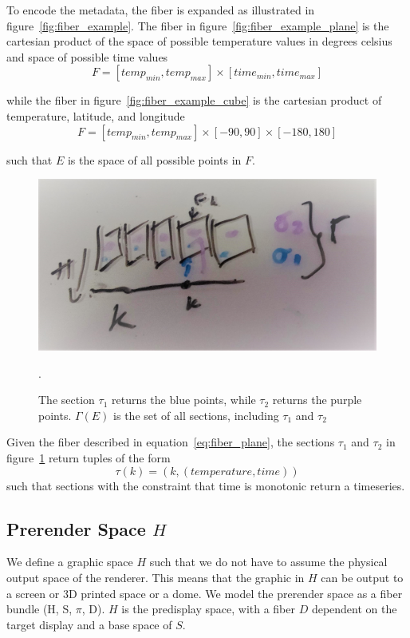 \documentclass[../main.tex]{subfiles}
\begin{document}
To encode the metadata, the fiber is expanded as illustrated in figure~\ref{fig:fiber_example}. The fiber in figure~\ref{fig:fiber_example_plane} is the cartesian product of the space of possible temperature values in degrees celsius and space of possible time values
\begin{equation}
F = [temp_{min}, temp_{max}] \times [time_{min}, time_{max}]
\label{eq:fiber_plane}
\end{equation}

while the fiber in figure~\ref{fig:fiber_example_cube} is the cartesian product of temperature, latitude, and longitude
\begin{equation}
F = [temp_{min}, temp_{max}] \times [-90, 90] \times [-180, 180]
\label{eg:fiber_cube}
\end{equation}

such that $E$ is the space of all possible points in $F$.

\begin{figure}[ht!]
    \includegraphics[width=1\linewidth]{figures/math/fiberbundle.png}
    \label{fig:fiber_example_section}
    \caption{The section $\tau_1$ returns the blue points,  while $\tau_2$ returns the purple points. $\Gamma(E)$ is the set of all sections, including $\tau_1$ and $\tau_2$}.  
\end{figure}
Given the fiber described in equation~\ref{eq:fiber_plane}, the sections $\tau_{1}$ and $\tau_{2}$ in figure~\ref{fig:fiber_example_section} return tuples of the form
\begin{equation}
\tau(k) = (k, (temperature, time))
\end{equation}
such that sections with the constraint that time is monotonic return a timeseries. 


\subsection{Prerender Space $H$}
\label{sec:graphic}
We define a graphic space $H$ such that we do not have to assume the physical output space of the renderer. This means that the graphic in $H$ can be output to a screen or 3D printed space or a dome. We model the prerender space as a fiber bundle (H, S, $\pi$, D). $H$ is the predisplay space, with a fiber $D$ dependent on the target display and a base space of $S$. 
\end{document}
